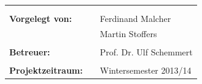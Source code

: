 \begin{verbatim}


\end{verbatim}
\begin{flushleft}
\begin{tabular}{lll}
& & \\
& & \\
\textbf{Vorgelegt von:} & & Ferdinand Malcher \\
                        & & Martin Stoffers \\
& & \\
\textbf{Betreuer:} & & Prof. Dr. Ulf Schemmert\\
& & \\
\textbf{Projektzeitraum:} & & Wintersemester 2013/14
\end{tabular}
\end{flushleft}
